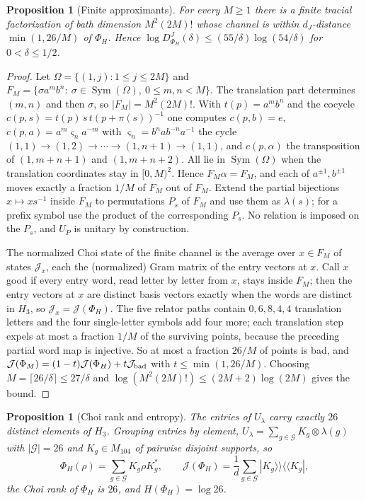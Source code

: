 \documentclass[11pt,a4paper]{article}
\theoremstyle{plain}
\newtheorem{proposition}[theorem]{Proposition}
\theoremstyle{definition}
\theoremstyle{remark}
\DeclareMathOperator{\Sym}{Sym}
\newcommand{\DChoi}{D^{J}}
\newcommand{\dJ}{d_J}
\begin{document}
\begin{proposition}[Finite approximants]\label{prop:upper-profile}
For every $M\ge1$ there is a finite tracial factorization of bath dimension $M^2(2M)!$ whose channel is within
$\dJ$-distance $\min(1,26/M)$ of $\Phi_H$. Hence $\log\DChoi_{\Phi_H}(\delta)\le(55/\delta)\log(54/\delta)$ for
$0<\delta\le1/2$.
\end{proposition}

\begin{proof}
Let $\Omega=\{(1,j):1\le j\le2M\}$ and $F_M=\{\sigma a^m b^{n}:\ \sigma\in\Sym(\Omega),\ 0\le m,n<M\}$. The
translation part determines $(m,n)$ and then $\sigma$, so $|F_M|=M^2(2M)!$. With $t(p)=a^mb^n$ and the cocycle
$c(p,s)=t(p)\,s\,t(p+\pi(s))^{-1}$ one computes $c(p,b)=e$, $c(p,a)=a^m\varsigma_na^{-m}$ with
$\varsigma_n=b^nab^{-n}a^{-1}$ the cycle $(1,1)\to(1,2)\to\cdots\to(1,n+1)\to(1,1)$, and $c(p,\alpha)$ the transposition
of $(1,m+n+1)$ and $(1,m+n+2)$. All lie in $\Sym(\Omega)$ when the translation coordinates stay in $[0,M)^2$. Hence
$F_M\alpha=F_M$, and each of $a^{\pm1},b^{\pm1}$ moves exactly a fraction $1/M$ of $F_M$ out of $F_M$. Extend the
partial bijections $x\mapsto xs^{-1}$ inside $F_M$ to permutations $P_s$ of $F_M$ and use them as $\lambda(s)$; for a
prefix symbol use the product of the corresponding $P_s$. No relation is imposed on the $P_s$, and $U_P$ is unitary by
construction.

The normalized Choi state of the finite channel is the average over $x\in F_M$ of states $\mathcal{J}_x$, each the
(normalized) Gram matrix of the entry vectors at $x$. Call $x$ good if every entry word, read letter by letter from
$x$, stays inside $F_M$; then the entry vectors at $x$ are distinct basis vectors exactly when the words are distinct
in $H_3$, so $\mathcal{J}_x=\mathcal{J}(\Phi_H)$. The five relator paths contain $0,6,8,4,4$ translation letters and the
four single-letter symbols add four more; each translation step expels at most a fraction $1/M$ of the surviving
points, because the preceding partial word map is injective. So at most a fraction $26/M$ of points is bad, and
$\mathcal{J}(\Phi_M)=(1-t)\mathcal{J}(\Phi_H)+t\mathcal{J}_{\rm bad}$ with $t\le\min(1,26/M)$. Choosing
$M=\lceil26/\delta\rceil\le27/\delta$ and $\log(M^2(2M)!)\le(2M+2)\log(2M)$ gives the bound.
\end{proof}


\begin{proposition}[Choi rank and entropy]\label{prop:entropy-H}
The entries of $U_\lambda$ carry exactly $26$ distinct elements of $H_3$. Grouping entries by element,
$U_\lambda=\sum_{g\in\mathcal G}K_g\otimes\lambda(g)$ with $|\mathcal G|=26$ and $K_g\in M_{104}$ of pairwise disjoint supports, so
\[
\Phi_H(\rho)=\sum_{g\in\mathcal G}K_g\rho K_g^*,\qquad
\mathcal J(\Phi_H)=\frac1d\sum_{g\in\mathcal G}|K_g\rangle\!\rangle\langle\!\langle K_g|,
\]
the Choi rank of $\Phi_H$ is $26$, and $H(\Phi_H)=\log26$.
\end{proposition}
\end{document}
